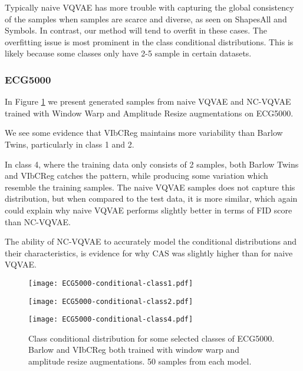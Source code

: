 \documentclass[../../thesis.tex]{subfiles}
\begin{document}
Typically naive VQVAE has more trouble with capturing the global consistency of the samples when samples are scarce and diverse, as seen on ShapesAll and Symbols. In contrast, our method will tend to overfit in these cases. The overfitting issue is most prominent in the class conditional distributions. This is likely because some classes only have 2-5 sample in certain datasets.

\subsubsection{ECG5000}

In Figure \ref{fig:Warp_ECG5000} we present generated samples from naive VQVAE and NC-VQVAE trained with Window Warp and Amplitude Resize augmentations on ECG5000.\newline

We see some evidence that VIbCReg maintains more variability than Barlow Twins, particularly in class 1 and 2. \newline

In class 4, where the training data only consists of 2 samples, both Barlow Twins and VIbCReg catches the pattern, while producing some variation which resemble the training samples. The naive VQVAE samples does not capture this distribution, but when compared to the test data, it is more similar, which again could explain why naive VQVAE performs slightly better in terms of FID score than NC-VQVAE. \newline

The ability of NC-VQVAE to accurately model the conditional distributions and their characteristics, is evidence for why CAS was slightly higher than for naive VQVAE.


\begin{figure}[H]
    \centering
    \begin{minipage}[b]{0.32\textwidth}
        \centering
        \texttt{[image: ECG5000-conditional-class1.pdf]}
    \end{minipage}
    \begin{minipage}[b]{0.32\textwidth}
        \centering
        \texttt{[image: ECG5000-conditional-class2.pdf]}
    \end{minipage}
    \begin{minipage}[b]{0.32\textwidth}
        \centering
        \texttt{[image: ECG5000-conditional-class4.pdf]}
    \end{minipage}
    \caption{Class conditional distribution for some selected classes of ECG5000. Barlow and VIbCReg both trained with window warp and amplitude resize augmentations. 50 samples from each model.}
    \label{fig:Warp_ECG5000}
\end{figure}
\end{document}
